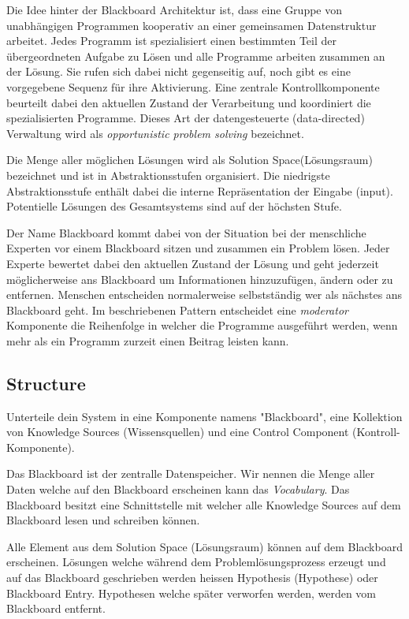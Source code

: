 Die Idee hinter der Blackboard Architektur ist, dass eine Gruppe von unabhängigen Programmen kooperativ an einer gemeinsamen Datenstruktur arbeitet. Jedes Programm ist spezialisiert einen bestimmten Teil der übergeordneten Aufgabe zu Lösen und alle Programme arbeiten zusammen an der Lösung. Sie rufen sich dabei nicht gegenseitig auf, noch gibt es eine vorgegebene Sequenz für ihre Aktivierung. Eine zentrale Kontrollkomponente beurteilt dabei den aktuellen Zustand der Verarbeitung und koordiniert die spezialisierten Programme. Dieses Art der datengesteuerte (data-directed) Verwaltung wird als \textit{opportunistic problem solving} bezeichnet.

Die Menge aller möglichen Lösungen wird als Solution Space(Lösungsraum) bezeichnet und ist in Abstraktionsstufen organisiert. Die niedrigste Abstraktionsstufe enthält dabei die interne Repräsentation der Eingabe (input). Potentielle Lösungen des Gesamtsystems sind auf der höchsten Stufe.

Der Name Blackboard kommt dabei von der Situation bei der menschliche Experten vor einem Blackboard sitzen und zusammen ein Problem lösen. Jeder Experte bewertet dabei den aktuellen Zustand der Lösung und geht jederzeit möglicherweise ans Blackboard um Informationen hinzuzufügen, ändern oder zu entfernen. Menschen entscheiden normalerweise selbstständig wer als nächstes ans Blackboard geht. Im beschriebenen Pattern entscheidet eine \textit{moderator} Komponente die Reihenfolge in welcher die Programme ausgeführt werden, wenn mehr als ein Programm zurzeit einen Beitrag leisten kann.


\subsection*{Structure}


Unterteile dein System in eine Komponente namens "Blackboard", eine Kollektion von Knowledge Sources (Wissensquellen) und eine Control Component (Kontroll-Komponente).

Das Blackboard ist der zentralle Datenspeicher. Wir nennen die Menge aller Daten welche auf den Blackboard erscheinen kann das \textit{Vocabulary}. Das Blackboard besitzt eine Schnittstelle mit welcher alle Knowledge Sources auf dem Blackboard lesen und schreiben können.

Alle Element aus dem Solution Space (Lösungsraum) können auf dem Blackboard erscheinen. Lösungen welche während dem Problemlösungsprozess erzeugt und auf das Blackboard geschrieben werden heissen Hypothesis (Hypothese) oder Blackboard Entry. Hypothesen welche später verworfen werden, werden vom Blackboard entfernt.

